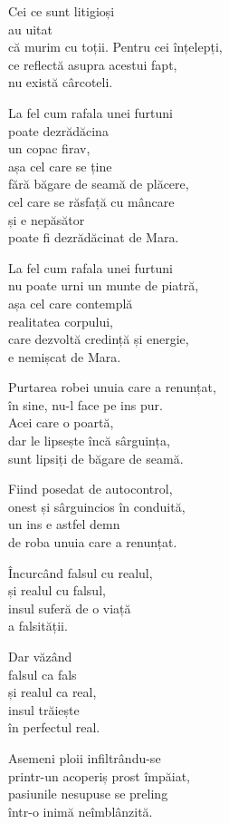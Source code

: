 Cei ce sunt litigioși\\
au uitat\\
că murim cu toții.
Pentru cei înțelepți,\\
ce reflectă asupra acestui fapt,\\
nu există cârcoteli.

La fel cum rafala unei furtuni\\
poate dezrădăcina\\
un copac firav,\\
așa cel care se ține\\
fără băgare de seamă de plăcere,\\
cel care se răsfață cu mâncare\\
și e nepăsător\\
poate fi dezrădăcinat de Mara.


La fel cum rafala unei furtuni\\
nu poate urni un munte de piatră,\\
așa cel care contemplă\\
realitatea corpului,\\
care dezvoltă credință și energie,\\
e nemișcat de Mara.

Purtarea robei unuia care a renunțat,\\
în sine, nu-l face pe ins pur.\\
Acei care o poartă,\\
dar le lipsește încă sârguința,\\
sunt lipsiți de băgare de seamă.

Fiind posedat de autocontrol,\\
onest și sârguincios în conduită,\\
un ins e astfel demn\\
de roba unuia care a renunțat.


Încurcând falsul cu realul,\\
și realul cu falsul,\\
insul suferă de o viață\\
a falsității.


Dar văzând\\
falsul ca fals\\
și realul ca real,\\
insul trăiește\\
în perfectul real.


Asemeni ploii infiltrându-se\\
printr-un acoperiș prost împăiat,\\
pasiunile nesupuse se preling\\
într-o inimă neîmblânzită.


